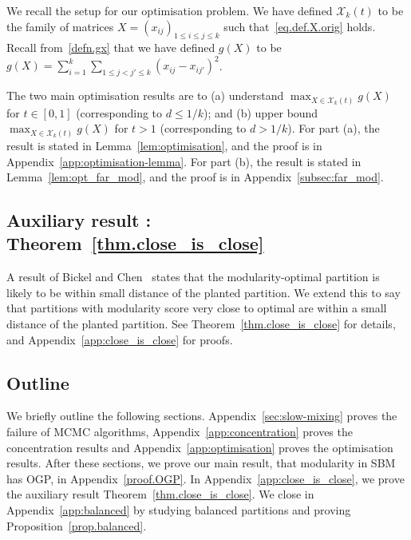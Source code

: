 \documentclass[a4paper,UKenglish,cleveref, autoref, thm-restate,numberwithinsect]{lipics-v2021}
\begin{document}
We recall the setup for our optimisation problem. We have defined $\mathcal{X}_k(t)$ to be the family of matrices $X=(x_{ij})_{1\leq i \leq j \leq k}$ such that~\eqref{eq.def.X.orig} holds.
%
Recall from~\eqref{defn.gx} that we have defined $g(X)$ to be %
$g(X) = \sum_{i=1}^k \sum_{1 \le j  < j' \le k}(x_{ij} - x_{ij'})^2$.%

The two main optimisation results are to (a) understand $\max_{X\in \mathcal{X}_{k}(t)}g(X)$ for $t\in [0,1]$ (corresponding to $d\leq 1/k$); and (b) upper bound $\max_{X\in \mathcal{X}_{k}(t)}g(X)$ for $t>1$ (corresponding to $d> 1/k$). For part (a), the result is stated in Lemma~\ref{lem:optimisation}, and the proof is in Appendix~\ref{app:optimisation-lemma}. For part (b), the result is stated in Lemma~\ref{lem:opt_far_mod}, and the proof is in Appendix~\ref{subsec:far_mod}.


\subsection{Auxiliary result : Theorem~\ref{thm.close_is_close}}
A result of Bickel and Chen~\cite{bickel2009nonparametric} states that the modularity-optimal partition is likely to be within small distance of the planted partition. We extend this to say that partitions with modularity score very close to optimal are within a small distance of the planted partition. See Theorem~\ref{thm.close_is_close} for details, and Appendix~\ref{app:close_is_close} for proofs.


\subsection{Outline}
We briefly outline the following sections. Appendix~\ref{sec:slow-mixing} proves the failure of MCMC algorithms, Appendix~\ref{app:concentration} proves the concentration results and Appendix~\ref{app:optimisation} proves the optimisation results. After these sections, we prove our main result, that modularity in SBM has OGP, in Appendix~\ref{proof.OGP}. In Appendix~\ref{app:close_is_close}, we prove the  auxiliary result Theorem~\ref{thm.close_is_close}.
We close in Appendix~\ref{app:balanced} by studying balanced partitions and proving Proposition~\ref{prop.balanced}.
\end{document}
